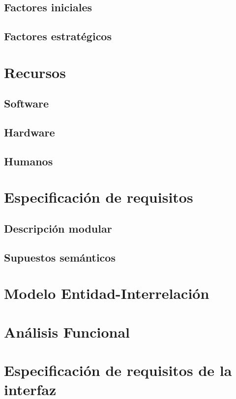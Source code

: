 \documentclass[a4paper,10pt,draft]{article}
\begin{document}
      \subsection{Factores iniciales}
      \subsection{Factores estratégicos}

   \section{Recursos}
      \subsection{Software}
      \subsection{Hardware}
      \subsection{Humanos}

   \section{Especificación de requisitos}
      \subsection{Descripción modular}
      \subsection{Supuestos semánticos}

   \section{Modelo Entidad-Interrelación}

   \section{Análisis Funcional}

   \section{Especificación de requisitos de la interfaz}
\end{document}
